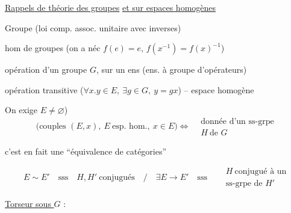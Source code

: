 \uline{Rappels de théorie des groupes} \uline{et sur espaces homogènes}

Groupe (loi comp. assoc. unitaire avec inverses)

hom de groupes (on a néc $f(e)=e$, $f(x^{-1})=f(x)^{-1}$)

opération d'un groupe $G$, sur un ens (ens. à groupe d'opérateurs)

opération transitive ($\forall x\mathord{.}y\in E,\ \exists g\in G,\ y=gx$) -- espace homogène

On exige  $E\ne\varnothing$)
\[
\bigl(\text{couples }(E,x),\ E\ \text{esp. hom.},\ x\in E\bigr)
\Longleftrightarrow
\begin{aligned}&\text{donnée d'un ss-grpe}\\&H\ \text{de }G\end{aligned}
\]

c'est en fait une ``équivalence de catégories''

{\small
{}}
{\small
\[
E\sim E'\quad\text{sss}\quad H,H'\ \text{conjugués}\quad\big/\quad
\exists E\to E'\quad\text{sss}\quad
\begin{aligned}&H\ \text{conjugué à un}\\[-2pt]&\text{ss-grpe de }H'\end{aligned}
\]}

\uline{Torseur sous $G$} :
{\small
{}}

